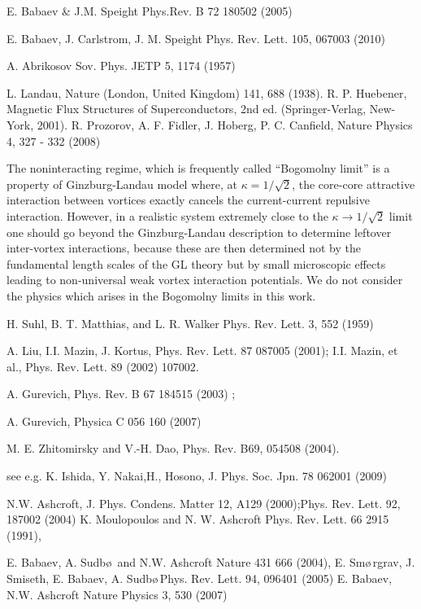 
\begin{thebibliography}{99}
  \renewcommand\bibname{Foobar}
 E. Babaev \& J.M. Speight Phys.Rev. B 72 180502 (2005)

 E. Babaev, J. Carlstrom, J. M. Speight Phys. Rev. Lett. 105, 067003 (2010)

 A. Abrikosov Sov. Phys. JETP 5, 1174 (1957)

 L. Landau, Nature (London, United Kingdom) 141, 688 (1938). R. P. Huebener, Magnetic Flux Structures of Superconductors, 2nd ed. (Springer-Verlag, New-York, 2001). R. Prozorov, A. F. Fidler, J. Hoberg, P. C. Canfield, Nature Physics 4, 327 - 332 (2008)

 The noninteracting regime, which is frequently called “Bogomolny limit” is a property of Ginzburg-Landau model where, at \( \kappa = 1/\sqrt{2} \), the core-core attractive interaction between vortices exactly cancels the current-current repulsive interaction. However, in a realistic system extremely close to the \( \kappa \to 1/\sqrt{2} \) limit one should go beyond the Ginzburg-Landau description to determine leftover inter-vortex interactions, because these are then determined not by the fundamental length scales of the GL theory but by small microscopic effects leading to non-universal weak vortex interaction potentials. We do not consider the physics which arises in the Bogomolny limits in this work.

 H. Suhl, B. T. Matthias, and L. R. Walker Phys. Rev. Lett. 3, 552 (1959)

 A. Liu, I.I. Mazin, J. Kortus, Phys. Rev. Lett. 87 087005 (2001); I.I. Mazin, et al., Phys. Rev. Lett. 89 (2002) 107002.

 A. Gurevich, Phys. Rev. B 67 184515 (2003) ;

 A. Gurevich, Physica C 056 160 (2007)

 M. E. Zhitomirsky and V.-H. Dao, Phys. Rev. B69, 054508 (2004).

 see e.g. K. Ishida, Y. Nakai,H., Hosono, J. Phys. Soc. Jpn. 78 062001 (2009)

 N.W. Ashcroft, J. Phys. Condens. Matter 12, A129 (2000);Phys. Rev. Lett. 92, 187002 (2004) K. Moulopoulos and N. W. Ashcroft Phys. Rev. Lett. 66 2915 (1991),

 E. Babaev, A. Sudb\o\,\! and N.W. Ashcroft Nature 431 666 (2004), E. Sm\o\,\!rgrav, J. Smiseth, E. Babaev, A. Sudb\o\,\!Phys. Rev. Lett. 94, 096401 (2005) E. Babaev, N.W. Ashcroft Nature Physics 3, 530 (2007)


\end{thebibliography}

